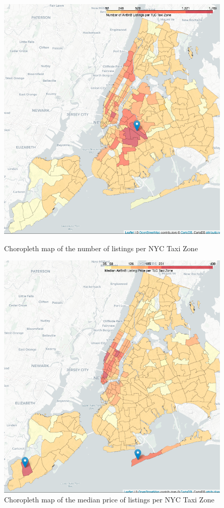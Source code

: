 \documentclass[11pt]{article}
\begin{document}
\begin{figure}[!htb]
\centering
\begin{minipage}[b]{0.45\linewidth}
\includegraphics[scale=0.26]{plots/num_listings.png}
\caption{Choropleth map of the number of listings per NYC Taxi Zone}
\label{fig:minipage1}
\end{minipage}
\quad
\begin{minipage}[b]{0.45\linewidth}
\includegraphics[scale=0.26]{plots/median_prce.png}
\caption{Choropleth map of the median price of listings per NYC Taxi Zone}
\label{fig:minipage2}
\end{minipage}
\end{figure}
\end{document}
